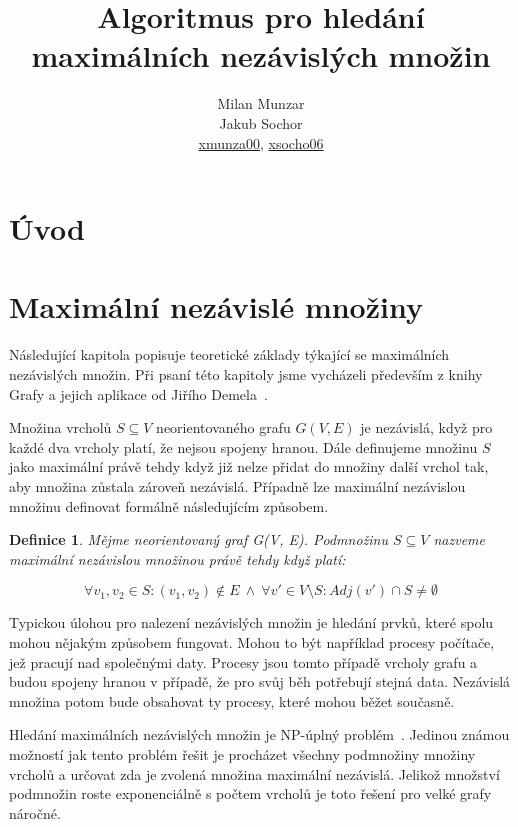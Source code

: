 \documentclass[12pt]{article}
\title{Algoritmus pro hledání maximálních nezávislých množin}
\author{Milan Munzar\\
Jakub Sochor\\
\normalsize{\url{xmunza00}, \url{xsocho06} }}
\date{}
\newtheorem{definition}{Definice}
\begin{document}
\maketitle

\section{Úvod}



\section{Maximální nezávislé množiny}

Následující kapitola popisuje teoretické základy týkající se maximálních nezávislých množin. Při psaní této kapitoly jsme vycházeli především z knihy Grafy a jejich aplikace od Jiřího Demela~\cite{demel}.

Množina vrcholů $S \subseteq V$ neorientovaného grafu $G(V,E)$ je nezávislá, když pro každé dva vrcholy platí, že nejsou spojeny hranou. Dále definujeme množinu $S$ jako maximální právě tehdy když již nelze přidat do množiny další vrchol tak, aby množina zůstala zároveň nezávislá. Případně lze maximální nezávislou množinu definovat formálně následujícím způsobem.

\begin{definition}
Mějme neorientovaný graf G(V, E). Podmnožinu $S \subseteq V$ nazveme maximální nezávislou množinou právě tehdy když platí:

\begin{equation*}
\forall v_1, v_2 \in S: (v_1, v_2) \notin E\ \wedge\ \forall v' \in V \setminus S: Adj(v') \cap S \neq \emptyset
\end{equation*}



\end{definition}


Typickou úlohou pro nalezení nezávislých množin je hledání prvků, které spolu mohou nějakým způsobem fungovat. Mohou to být například procesy počítače, jež pracují nad společnými daty. Procesy jsou tomto případě vrcholy grafu a budou spojeny hranou v případě, že pro svůj běh potřebují stejná data. Nezávislá množina potom bude obsahovat ty procesy, které mohou běžet současně.

Hledání maximálních nezávislých množin je NP-úplný problém~\cite{tarjan}. Jedinou známou možností jak tento problém řešit je procházet všechny podmnožiny množiny vrcholů a určovat zda je zvolená množina maximální nezávislá. Jelikož množství podmnožin roste exponenciálně s počtem vrcholů je toto řešení pro velké grafy náročné.
\end{document}
